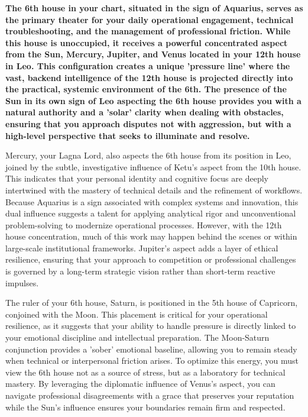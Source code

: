 {\fontsize{9.5}{13.8}\selectfont\bfseries\color{DeepSlate} The 6th house in your chart, situated in the sign of Aquarius, serves as the primary theater for your daily operational engagement, technical troubleshooting, and the management of professional friction. While this house is unoccupied, it receives a powerful concentrated aspect from the Sun, Mercury, Jupiter, and Venus located in your 12th house in Leo. This configuration creates a unique 'pressure line' where the vast, backend intelligence of the 12th house is projected directly into the practical, systemic environment of the 6th. The presence of the Sun in its own sign of Leo aspecting the 6th house provides you with a natural authority and a 'solar' clarity when dealing with obstacles, ensuring that you approach disputes not with aggression, but with a high-level perspective that seeks to illuminate and resolve.}\par\vspace{2mm}

{\fontsize{9}{13}\selectfont Mercury, your Lagna Lord, also aspects the 6th house from its position in Leo, joined by the subtle, investigative influence of Ketu's aspect from the 10th house. This indicates that your personal identity and cognitive focus are deeply intertwined with the mastery of technical details and the refinement of workflows. Because Aquarius is a sign associated with complex systems and innovation, this dual influence suggests a talent for applying analytical rigor and unconventional problem-solving to modernize operational processes. However, with the 12th house concentration, much of this work may happen behind the scenes or within large-scale institutional frameworks. Jupiter's aspect adds a layer of ethical resilience, ensuring that your approach to competition or professional challenges is governed by a long-term strategic vision rather than short-term reactive impulses.}\par\vspace{1.8mm}

{\fontsize{9}{13}\selectfont The ruler of your 6th house, Saturn, is positioned in the 5th house of Capricorn, conjoined with the Moon. This placement is critical for your operational resilience, as it suggests that your ability to handle pressure is directly linked to your emotional discipline and intellectual preparation. The Moon-Saturn conjunction provides a 'sober' emotional baseline, allowing you to remain steady when technical or interpersonal friction arises. To optimize this energy, you must view the 6th house not as a source of stress, but as a laboratory for technical mastery. By leveraging the diplomatic influence of Venus's aspect, you can navigate professional disagreements with a grace that preserves your reputation while the Sun's influence ensures your boundaries remain firm and respected.}\par\vspace{1.8mm}

